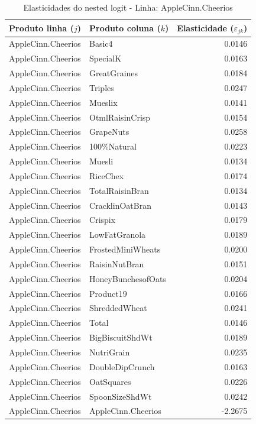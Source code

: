 \begingroup
\begin{table}[H]
\centering
\caption{Elasticidades do nested logit - Linha: AppleCinn.Cheerios}
\label{tab:elas-nested-applecinn-cheerios}
\small
\begin{tabular}{llr}
\toprule
Produto linha ($j$) & Produto coluna ($k$) & Elasticidade ($\varepsilon_{jk}$) \\
\midrule
AppleCinn.Cheerios & Basic4 & 0.0146 \\
AppleCinn.Cheerios & SpecialK & 0.0163 \\
AppleCinn.Cheerios & GreatGraines & 0.0184 \\
AppleCinn.Cheerios & Triples & 0.0247 \\
AppleCinn.Cheerios & Mueslix & 0.0141 \\
AppleCinn.Cheerios & OtmlRaisinCrisp & 0.0154 \\
AppleCinn.Cheerios & GrapeNuts & 0.0258 \\
AppleCinn.Cheerios & 100\%Natural & 0.0223 \\
AppleCinn.Cheerios & Muesli & 0.0134 \\
AppleCinn.Cheerios & RiceChex & 0.0174 \\
AppleCinn.Cheerios & TotalRaisinBran & 0.0134 \\
AppleCinn.Cheerios & CracklinOatBran & 0.0143 \\
AppleCinn.Cheerios & Crispix & 0.0179 \\
AppleCinn.Cheerios & LowFatGranola & 0.0189 \\
AppleCinn.Cheerios & FrostedMiniWheats & 0.0200 \\
AppleCinn.Cheerios & RaisinNutBran & 0.0151 \\
AppleCinn.Cheerios & HoneyBunchesofOats & 0.0204 \\
AppleCinn.Cheerios & Product19 & 0.0166 \\
AppleCinn.Cheerios & ShreddedWheat & 0.0241 \\
AppleCinn.Cheerios & Total & 0.0146 \\
AppleCinn.Cheerios & BigBiscuitShdWt & 0.0189 \\
AppleCinn.Cheerios & NutriGrain & 0.0235 \\
AppleCinn.Cheerios & DoubleDipCrunch & 0.0163 \\
AppleCinn.Cheerios & OatSquares & 0.0226 \\
AppleCinn.Cheerios & SpoonSizeShdWt & 0.0242 \\
AppleCinn.Cheerios & AppleCinn.Cheerios & -2.2675 \\

\end{tabular}
\end{table}
